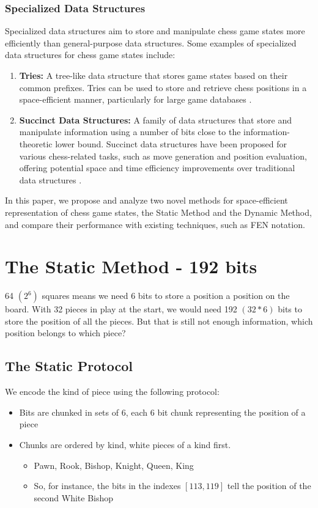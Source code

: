 \documentclass[journal]{journal}
\begin{document}
\subsubsection{Specialized Data Structures}  
Specialized data structures aim to store and manipulate chess game states more efficiently than general-purpose data structures. Some examples of specialized data structures for chess game states include:  
   
\begin{enumerate}  
  \item \textbf{Tries:} A tree-like data structure that stores game states based on their common prefixes. Tries can be used to store and retrieve chess positions in a space-efficient manner, particularly for large game databases \cite{fredkin1960trie}.  
    
  \item \textbf{Succinct Data Structures:} A family of data structures that store and manipulate information using a number of bits close to the information-theoretic lower bound. Succinct data structures have been proposed for various chess-related tasks, such as move generation and position evaluation, offering potential space and time efficiency improvements over traditional data structures \cite{navarro2016compact}.  
\end{enumerate}  
   
In this paper, we propose and analyze two novel methods for space-efficient representation of chess game states, the Static Method and the Dynamic Method, and compare their performance with existing techniques, such as FEN notation.

\newpage
\section{The Static Method - 192 bits}
64 $(2^6)$ squares means we need 6 bits to store a position a position on the board. With 32 pieces in play at the start, we would need 192 $(32 * 6)$ bits to store the position of all the pieces. But that is still not enough information, which position belongs to which piece?

\subsection{The Static Protocol}
We encode the kind of piece using the following  protocol:
\begin{itemize}
    \item Bits are chunked in sets of 6, each 6 bit chunk representing the position of a piece
    \item Chunks are ordered by kind, white pieces of a kind first.
        \begin{itemize}
            \item Pawn, Rook, Bishop, Knight, Queen, King
            \item So, for instance, the bits in the indexes $[113, 119]$ tell the position of the second White Bishop
        \end{itemize}
\end{itemize}
\end{document}
